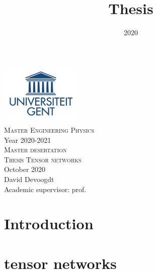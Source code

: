 \documentclass{article}
\title{Thesis}
\date{2020}
\begin{document}


\onecolumn
\begin{titlepage}
    \begin{center}

        \includegraphics[width=4cm]{Figuren/UGent.png} \\[0.5cm]    %

        \Large{\textsc{Master Engineering Physics}} \\[0.5cm]  %

        \normalsize{Year 2020-2021} \\[3cm]  %

        \huge{\textsc{Master desertation}} \\[0.25cm]   %

        \Large{\textsc{Thesis Tensor networks}}\\[0.25cm]

        \large \textnormal{October 2020} \\[2.5cm]   %


        David Devoogdt \\       [2.5cm]

        Academic supervisor: prof.

        \vfill

    \end{center}
\end{titlepage}

\tableofcontents

\newpage
\listoftodos
\newpage

{}



\section{Introduction}


\section{tensor networks}

\end{document}

